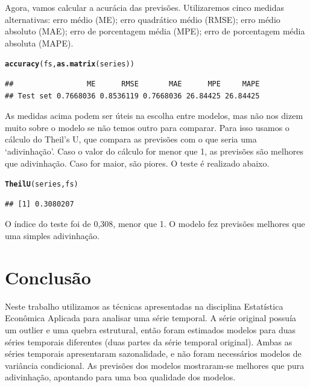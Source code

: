 \documentclass{article}\usepackage[]{graphicx}\usepackage[]{color}
\makeatletter
\newcommand{\hlstd}[1]{\textcolor[rgb]{0.345,0.345,0.345}{#1}}%
\newcommand{\hlkwd}[1]{\textcolor[rgb]{0.737,0.353,0.396}{\textbf{#1}}}%
\newenvironment{kframe}{%
 \def\at@end@of@kframe{}%
 \ifinner\ifhmode%
  \def\at@end@of@kframe{\end{minipage}}%
  \begin{minipage}{\columnwidth}%
 \fi\fi%
 \def\FrameCommand##1{\hskip\@totalleftmargin \hskip-\fboxsep
 \colorbox{shadecolor}{##1}\hskip-\fboxsep
     \hskip-\linewidth \hskip-\@totalleftmargin \hskip\columnwidth}%
 \MakeFramed {\advance\hsize-\width
   \@totalleftmargin\z@ \linewidth\hsize
   \@setminipage}}%
 {\par\unskip\endMakeFramed%
 \at@end@of@kframe}
\newenvironment{knitrout}{}{} %
\makeatother
\begin{document}
            Agora, vamos calcular a acurácia das previsões. Utilizaremos cinco medidas alternativas: erro médio (ME); erro quadrático médio (RMSE); erro médio absoluto (MAE); erro de porcentagem média (MPE); erro de porcentagem média absoluta (MAPE).
            
\begin{knitrout}
\color{fgcolor}\begin{kframe}
\begin{alltt}
\hlkwd{accuracy}\hlstd{(fs,}\hlkwd{as.matrix}\hlstd{(series))}
\end{alltt}
\begin{verbatim}
##                 ME      RMSE       MAE      MPE     MAPE
## Test set 0.7668036 0.8536119 0.7668036 26.84425 26.84425
\end{verbatim}
\end{kframe}
\end{knitrout}

            As medidas acima podem ser úteis na escolha entre modelos, mas não nos dizem muito sobre o modelo se não temos outro para comparar. Para isso usamos o cálculo do Theil's U, que compara as previsões com o que seria uma `adivinhação'. Caso o valor do cálculo for menor que 1, as previsões são melhores que adivinhação. Caso for maior, são piores. O teste é realizado abaixo.
            
\begin{knitrout}
\color{fgcolor}\begin{kframe}
\begin{alltt}
\hlkwd{TheilU}\hlstd{(series,fs)}
\end{alltt}
\begin{verbatim}
## [1] 0.3080207
\end{verbatim}
\end{kframe}
\end{knitrout}
            
            O índice do teste foi de 0,308, menor que 1. O modelo fez previsões melhores que uma simples adivinhação.
            
            
            
            
        
        



\section{Conclusão}

    Neste trabalho utilizamos as técnicas apresentadas na disciplina Estatística Econômica Aplicada para analisar uma série temporal. A série original possuía um outlier e uma quebra estrutural, então foram estimados modelos para duas séries temporais diferentes (duas partes da série temporal original). Ambas as séries temporais apresentaram sazonalidade, e não foram necessários modelos de variância condicional. As previsões dos modelos mostraram-se melhores que pura adivinhação, apontando para uma boa qualidade dos modelos.




\printbibliography[heading=bibintoc]
\end{document}
